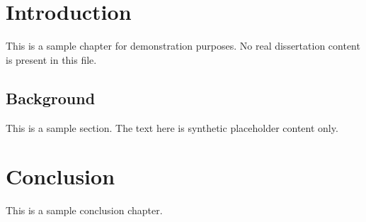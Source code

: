 \documentclass[12pt]{report}
\begin{document}
\doublespacing
\chapter{Introduction}
This is a sample chapter for demonstration purposes.
No real dissertation content is present in this file.

\section{Background}
This is a sample section. The text here is synthetic placeholder content only.

\chapter{Conclusion}
This is a sample conclusion chapter.
\end{document}
